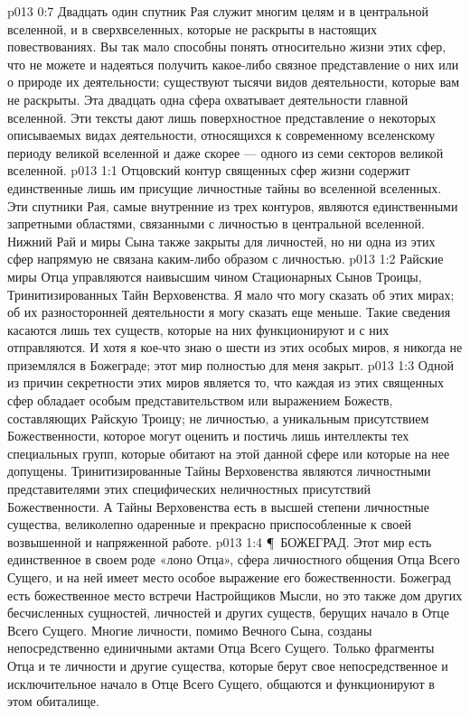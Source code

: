 \vs p013 0:7 Двадцать один спутник Рая служит многим целям и в центральной вселенной, и в сверхвселенных, которые не раскрыты в настоящих повествованиях. Вы так мало способны понять относительно жизни этих сфер, что не можете и надеяться получить какое\hyp{}либо связное представление о них или о природе их деятельности; существуют тысячи видов деятельности, которые вам не раскрыты. Эта двадцать одна сфера охватывает  деятельности главной вселенной. Эти тексты дают лишь поверхностное представление о некоторых описываемых видах деятельности, относящихся к современному вселенскому периоду великой вселенной и даже скорее --- одного из семи секторов великой вселенной.
\vs p013 1:1 Отцовский контур священных сфер жизни содержит единственные лишь им присущие личностные тайны во вселенной вселенных. Эти спутники Рая, самые внутренние из трех контуров, являются единственными запретными областями, связанными с личностью в центральной вселенной. Нижний Рай и миры Сына также закрыты для личностей, но ни одна из этих сфер напрямую не связана каким\hyp{}либо образом с личностью.
\vs p013 1:2 Райские миры Отца управляются наивысшим чином Стационарных Сынов Троицы, Тринитизированных Тайн Верховенства. Я мало что могу сказать об этих мирах; об их разносторонней деятельности я могу сказать еще меньше. Такие сведения касаются лишь тех существ, которые на них функционируют и с них отправляются. И хотя я кое\hyp{}что знаю о шести из этих особых миров, я никогда не приземлялся в Божеграде; этот мир полностью для меня закрыт.
\vs p013 1:3 Одной из причин секретности этих миров является то, что каждая из этих священных сфер обладает особым представительством или выражением Божеств, составляющих Райскую Троицу; не личностью, а уникальным присутствием Божественности, которое могут оценить и постичь лишь интеллекты тех специальных групп, которые обитают на этой данной сфере или которые на нее допущены. Тринитизированные Тайны Верховенства являются личностными представителями этих специфических неличностных присутствий Божественности. А Тайны Верховенства есть в высшей степени личностные существа, великолепно одаренные и прекрасно приспособленные к своей возвышенной и напряженной работе.
\vs p013 1:4 \P\ \bibnobreakspace БОЖЕГРАД. Этот мир есть единственное в своем роде «лоно Отца», сфера личностного общения Отца Всего Сущего, и на ней имеет место особое выражение его божественности. Божеград есть божественное место встречи Настройщиков Мысли, но это также дом других бесчисленных сущностей, личностей и других существ, берущих начало в Отце Всего Сущего. Многие личности, помимо Вечного Сына, созданы непосредственно единичными актами Отца Всего Сущего. Только фрагменты Отца и те личности и другие существа, которые берут свое непосредственное и исключительное начало в Отце Всего Сущего, общаются и функционируют в этом обиталище.
